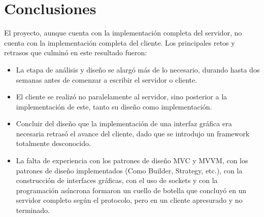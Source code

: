 \chapter{Conclusiones}

El proyecto, aunque cuenta con la implementación completa del servidor, no cuenta con la implementación completa del cliente. Los principales retos y retrasos que culminó en este resultado fueron:
\begin{itemize}
	\item La etapa de análisis y diseño se alargó más de lo necesario, durando hasta dos semanas antes de comenzar a escribir el servidor o cliente.
	\item El cliente se realizó no paralelamente al servidor, sino posterior a la implementación de este, tanto su diseño como implementación.
	\item Concluir del diseño que la implementación de una interfaz gráfica era necesaria retrasó el avance del cliente, dado que se introdujo un framework totalmente desconocido.
	\item La falta de experiencia con los patrones de diseño MVC y MVVM, con los patrones de diseño implementados (Como Builder, Strategy, etc.), con la construcción de interfaces gráficas, con el uso de sockets y con la programación asíncrona formaron un cuello de botella que concluyó en un servidor completo según el protocolo, pero en un cliente apresurado y no terminado.
\end{itemize}